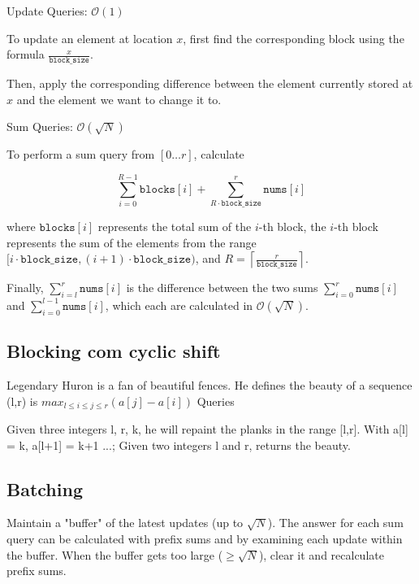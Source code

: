         Update Queries: $\mathcal{O}(1)$
        
        To update an element at location $x$, first find the corresponding block using
        the formula $\frac{x}{\texttt{block\_size}}$.
        
        Then, apply the corresponding difference between the element currently stored at
        $x$ and the element we want to change it to.
        
        Sum Queries: $\mathcal{O}(\sqrt{N})$
        
        To perform a sum query from $[0\ldots r]$, calculate
        
        $$\sum_{i = 0}^{R-1} \texttt{blocks}[i] + \sum_{R \cdot \texttt{block\_size}}^r \texttt{nums}[i]$$
        
        where $\texttt{blocks}[i]$ represents the total sum of the $i$-th block, the
        $i$-th block represents the sum of the elements from the range $[i\cdot \texttt{block\_size},(i + 1)\cdot \texttt{block\_size})$, and $R=\left\lceil \frac{r}{\texttt{block\_size}} \right\rceil$.
        
        Finally, $\sum_{i=l}^{r} \texttt{nums}[i]$ is the difference between the two
        sums $\sum_{i=0}^{r}\texttt{nums}[i]$ and $\sum_{i=0}^{l-1}\texttt{nums}[i]$,
        which each are calculated in $\mathcal{O}(\sqrt N)$.

        
        \subsection{Blocking com cyclic shift}
        Legendary Huron is a fan of beautiful fences. He defines the beauty of a sequence (l,r) is $max_{l \leq i \leq j \leq r}(a[j]-a[i])$
        Queries
        
        Given three integers l, r, k, he will repaint the planks in the range [l,r]. With a[l] = k, a[l+1] = k+1 ...;
        Given two integers l and r, returns the beauty.
        
        \subsection{Batching}
        Maintain a "buffer" of the latest updates (up to $\sqrt N$). The answer for each
        sum query can be calculated with prefix sums and by examining each update within
        the buffer. When the buffer gets too large ($\ge \sqrt N$), clear it and
        recalculate prefix sums.
        

